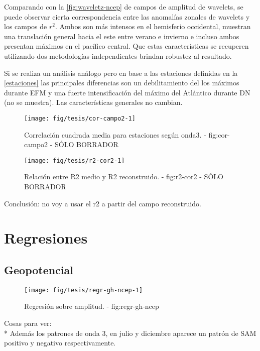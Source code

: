 \documentclass[spanish,a4paper]{book}
\begin{document}
Comparando con la \autoref{fig:waveletz-ncep} de campos de amplitud de
wavelets, se puede observar cierta correspondencia entre las anomalías
zonales de wavelets y los campos de \(r^2\). Ambos son más intensos en
el hemisferio occidental, muestran una translación general hacia el este
entre verano e invierno e incluso ambos presentan máximos en el pacífico
central. Que estas características se recuperen utilizando dos
metodologías independientes brindan robustez al resultado.

Si se realiza un análisis análogo pero en base a las estaciones
definidas en la \autoref{estaciones} las principales diferencias son un
debilitamiento del los máximos durante EFM y una fuerte intensificación
del máximo del Atlántico durante DN (no se muestra). Las características
generales no cambian.

\begin{figure}
\texttt{[image: fig/tesis/cor-campo2-1]} \caption{Correlación cuadrada media para estaciones según onda3. - fig:cor-campo2 - SÓLO BORRADOR}\label{fig:cor-campo2}
\end{figure}


\begin{figure}
\texttt{[image: fig/tesis/r2-cor2-1]} \caption{Relación entre R2 medio y R2 reconstruido. - fig:r2-cor2 - SÓLO BORRADOR}\label{fig:r2-cor2}
\end{figure}

Conclusión: no voy a usar el r2 a partir del campo reconstruido.

\section{Regresiones}\label{regresiones}

\subsection{Geopotencial}\label{geopotencial}

\begin{figure}

{\centering \texttt{[image: fig/tesis/regr-gh-ncep-1]} 

}

\caption{Regresión sobre amplitud. - fig:regr-gh-ncep}\label{fig:regr-gh-ncep}
\end{figure}

Cosas para ver:\\
* Además los patrones de onda 3, en julio y diciembre aparece un patrón
de SAM positivo y negativo respectivamente.
\end{document}
